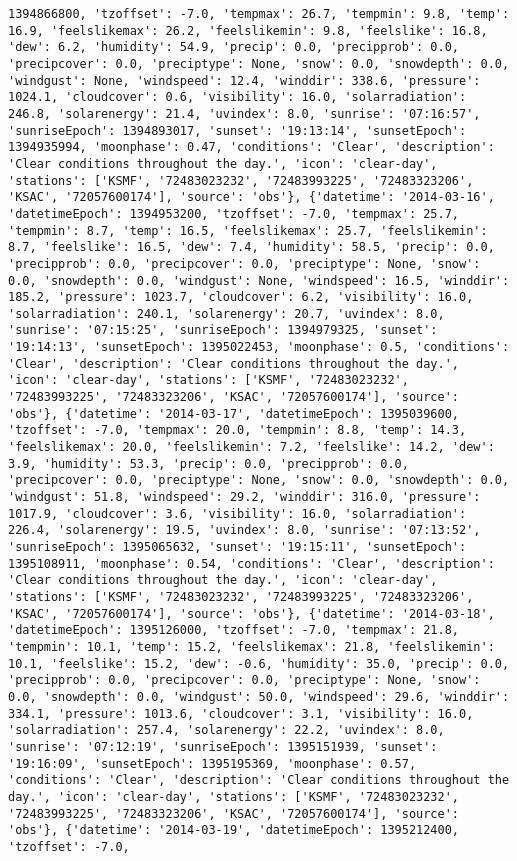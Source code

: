 \documentclass[
  letterpaper,
  DIV=11,
  numbers=noendperiod]{scrartcl}
\begin{document}
\begin{verbatim}
1394866800, 'tzoffset': -7.0, 'tempmax': 26.7, 'tempmin': 9.8, 'temp': 16.9, 'feelslikemax': 26.2, 'feelslikemin': 9.8, 'feelslike': 16.8, 'dew': 6.2, 'humidity': 54.9, 'precip': 0.0, 'precipprob': 0.0, 'precipcover': 0.0, 'preciptype': None, 'snow': 0.0, 'snowdepth': 0.0, 'windgust': None, 'windspeed': 12.4, 'winddir': 338.6, 'pressure': 1024.1, 'cloudcover': 0.6, 'visibility': 16.0, 'solarradiation': 246.8, 'solarenergy': 21.4, 'uvindex': 8.0, 'sunrise': '07:16:57', 'sunriseEpoch': 1394893017, 'sunset': '19:13:14', 'sunsetEpoch': 1394935994, 'moonphase': 0.47, 'conditions': 'Clear', 'description': 'Clear conditions throughout the day.', 'icon': 'clear-day', 'stations': ['KSMF', '72483023232', '72483993225', '72483323206', 'KSAC', '72057600174'], 'source': 'obs'}, {'datetime': '2014-03-16', 'datetimeEpoch': 1394953200, 'tzoffset': -7.0, 'tempmax': 25.7, 'tempmin': 8.7, 'temp': 16.5, 'feelslikemax': 25.7, 'feelslikemin': 8.7, 'feelslike': 16.5, 'dew': 7.4, 'humidity': 58.5, 'precip': 0.0, 'precipprob': 0.0, 'precipcover': 0.0, 'preciptype': None, 'snow': 0.0, 'snowdepth': 0.0, 'windgust': None, 'windspeed': 16.5, 'winddir': 185.2, 'pressure': 1023.7, 'cloudcover': 6.2, 'visibility': 16.0, 'solarradiation': 240.1, 'solarenergy': 20.7, 'uvindex': 8.0, 'sunrise': '07:15:25', 'sunriseEpoch': 1394979325, 'sunset': '19:14:13', 'sunsetEpoch': 1395022453, 'moonphase': 0.5, 'conditions': 'Clear', 'description': 'Clear conditions throughout the day.', 'icon': 'clear-day', 'stations': ['KSMF', '72483023232', '72483993225', '72483323206', 'KSAC', '72057600174'], 'source': 'obs'}, {'datetime': '2014-03-17', 'datetimeEpoch': 1395039600, 'tzoffset': -7.0, 'tempmax': 20.0, 'tempmin': 8.8, 'temp': 14.3, 'feelslikemax': 20.0, 'feelslikemin': 7.2, 'feelslike': 14.2, 'dew': 3.9, 'humidity': 53.3, 'precip': 0.0, 'precipprob': 0.0, 'precipcover': 0.0, 'preciptype': None, 'snow': 0.0, 'snowdepth': 0.0, 'windgust': 51.8, 'windspeed': 29.2, 'winddir': 316.0, 'pressure': 1017.9, 'cloudcover': 3.6, 'visibility': 16.0, 'solarradiation': 226.4, 'solarenergy': 19.5, 'uvindex': 8.0, 'sunrise': '07:13:52', 'sunriseEpoch': 1395065632, 'sunset': '19:15:11', 'sunsetEpoch': 1395108911, 'moonphase': 0.54, 'conditions': 'Clear', 'description': 'Clear conditions throughout the day.', 'icon': 'clear-day', 'stations': ['KSMF', '72483023232', '72483993225', '72483323206', 'KSAC', '72057600174'], 'source': 'obs'}, {'datetime': '2014-03-18', 'datetimeEpoch': 1395126000, 'tzoffset': -7.0, 'tempmax': 21.8, 'tempmin': 10.1, 'temp': 15.2, 'feelslikemax': 21.8, 'feelslikemin': 10.1, 'feelslike': 15.2, 'dew': -0.6, 'humidity': 35.0, 'precip': 0.0, 'precipprob': 0.0, 'precipcover': 0.0, 'preciptype': None, 'snow': 0.0, 'snowdepth': 0.0, 'windgust': 50.0, 'windspeed': 29.6, 'winddir': 334.1, 'pressure': 1013.6, 'cloudcover': 3.1, 'visibility': 16.0, 'solarradiation': 257.4, 'solarenergy': 22.2, 'uvindex': 8.0, 'sunrise': '07:12:19', 'sunriseEpoch': 1395151939, 'sunset': '19:16:09', 'sunsetEpoch': 1395195369, 'moonphase': 0.57, 'conditions': 'Clear', 'description': 'Clear conditions throughout the day.', 'icon': 'clear-day', 'stations': ['KSMF', '72483023232', '72483993225', '72483323206', 'KSAC', '72057600174'], 'source': 'obs'}, {'datetime': '2014-03-19', 'datetimeEpoch': 1395212400, 'tzoffset': -7.0, 
\end{verbatim}
\end{document}
